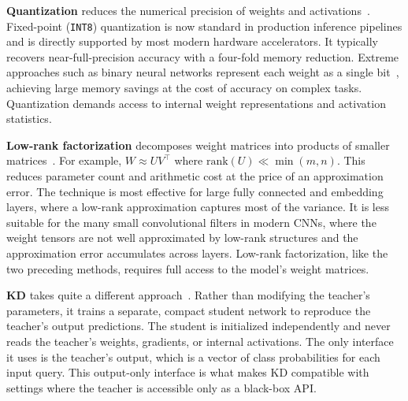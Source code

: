 \begin{foldable}
  \textbf{Quantization} reduces the numerical precision of weights and activations~\cite{jacob2018quantization}.
  Fixed-point (\texttt{INT8}) quantization is now standard in production inference pipelines and is directly supported by most modern hardware accelerators.
  It typically recovers near-full-precision accuracy with a four-fold memory reduction.
  Extreme approaches such as binary neural networks represent each weight as a single bit~\cite{hubara2018quantized}, achieving large memory savings at the cost of accuracy on complex tasks.
  Quantization demands access to internal weight representations and activation statistics.
\end{foldable}

\begin{foldable}
  \textbf{Low-rank factorization} decomposes weight matrices into products of smaller matrices~\cite{hu2022lora}.
  For example, $W \approx UV^{\top}$ where $\text{rank}(U) \ll \min(m,n)$.
  This reduces parameter count and arithmetic cost at the price of an approximation error.
  The technique is most effective for large fully connected and embedding layers, where a low-rank approximation captures most of the variance.
  It is less suitable for the many small convolutional filters in modern CNNs, where the weight tensors are not well approximated by low-rank structures and the approximation error accumulates across layers.
  Low-rank factorization, like the two preceding methods, requires full access to the model's weight matrices.
\end{foldable}

\begin{foldable}
  \textbf{\Acl{KD}} takes quite a different approach~\cite{hinton2015distilling}.
  Rather than modifying the teacher's parameters, it trains a separate, compact student network to reproduce the teacher's output predictions.
  The student is initialized independently and never reads the teacher's weights, gradients, or internal activations.
  The only interface it uses is the teacher's output, which is a vector of class probabilities for each input query.
  This output-only interface is what makes \ac{KD} compatible with settings where the teacher is accessible only as a black-box \ac{API}.
\end{foldable}

